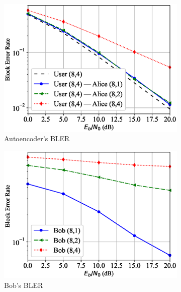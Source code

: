 \begin{figure}[tp!]
	\begin{subfigure}{0.3\textwidth}
		\includegraphics[width=\linewidth]{figs/covert_autoencoder_bler_rayleigh}
		\caption{Autoencoder's BLER}
		\label{fig:rayleigh_resutls_ae}
	\end{subfigure}
	\hspace*{\fill}
	\begin{subfigure}{0.3\textwidth}
		\includegraphics[width=\linewidth]{figs/bob_bler_rayleigh}
		\caption{Bob's BLER}
		\label{fig:rayleigh_resutls_bob}	
	\end{subfigure}
	\hspace*{\fill}
	\begin{subfigure}{0.3\textwidth}

\end{subfigure}
\end{figure}
